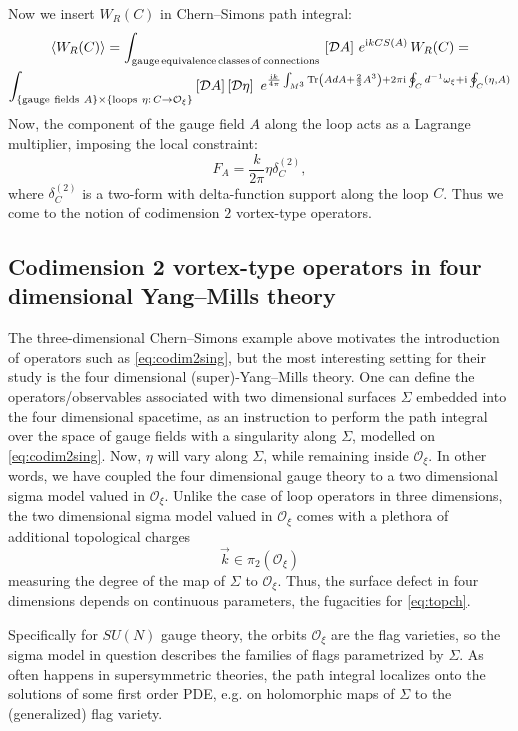\documentclass[12pt]{article}
\numberwithin{equation}{section}
\newcommand\beq{\begin{equation}}
\newcommand\eeq{\end{equation}}
\theoremstyle{definition}
\newcommand {\CalD} {\mathcal D}
\newcommand {\CalO} {\mathcal O}
\newcommand {\ii} {\mathrm{i}}
\newcommand{\Tr}{\text{Tr}}
\begin{document}
Now we insert
$W_{R}(C)$ in Chern--Simons path integral:
\begin{multline}
\langle W_{R}(C) \rangle = \int_{\rm gauge\, equivalence\, classes\, of\, connections}\, \left[ {\CalD}A \right]
\, e^{\ii k CS(A)} \, W_{R}(C) = \\
\int_{ \{{\rm gauge\ fields \ } A\} \times \{{\rm loops\ } \eta:\, C \rightarrow {\CalO}_{\xi} \}} \left[ {\CalD}A \right] \left[ {\CalD} {\eta} \right]\ e^{\frac{\ii k}{4\pi} \int_{M^{3}} {\Tr} \left( A dA + \frac{2}{3} A^{3} \right) + 2\pi\ii \oint_{C} d^{-1}{\omega}_{\xi}  + \ii \oint_{C} \left( {\eta}, A \right)}
\end{multline}
Now, the component of the gauge field $A$ along the loop acts as a Lagrange multiplier, imposing the local constraint:
\beq
F_{A} = \frac{k}{2\pi} {\eta} {\delta}^{(2)}_{C},
\label{eq:codim2sing}
\eeq
where $\delta^{(2)}_{C}$ is a two-form with delta-function support along the loop $C$. Thus we come to the notion of codimension $2$ vortex-type operators.
\subsection{Codimension 2 vortex-type operators in four dimensional Yang--Mills theory}
The three-dimensional Chern--Simons example above motivates the introduction of operators such as \eqref{eq:codim2sing}, but 
the most interesting setting for their study is
the four dimensional (super)-Yang--Mills theory. 
One can define the operators/observables associated with two dimensional surfaces $\Sigma$ embedded into
the four dimensional spacetime, as an instruction to perform the path integral over the space of gauge fields with a singularity along $\Sigma$, modelled
on \eqref{eq:codim2sing}. Now, $\eta$ will vary along $\Sigma$, while remaining inside $\CalO_{\xi}$. In other words, we have coupled the four dimensional gauge theory to a two dimensional sigma model valued in ${\CalO}_{\xi}$. Unlike the case of loop operators
in three dimensions, the two dimensional sigma model
valued in ${\CalO}_{\xi}$ comes with a plethora
of additional topological charges
\beq
{\vec k} \in {\pi}_{2}({\CalO}_{\xi})
\label{eq:topch}
\eeq
measuring the degree of the map of $\Sigma$ to ${\CalO}_{\xi}$. Thus, the surface defect in four dimensions depends on continuous parameters, the fugacities for \eqref{eq:topch}. 

Specifically for $SU(N)$ gauge theory, the orbits
${\CalO}_{\xi}$ are the flag varieties, so the sigma model in question describes the families of flags parametrized by $\Sigma$. As often happens in supersymmetric theories, the path integral localizes onto the solutions of some first order PDE, e.g.
on holomorphic maps of $\Sigma$ to the (generalized) flag variety. 
\end{document}
